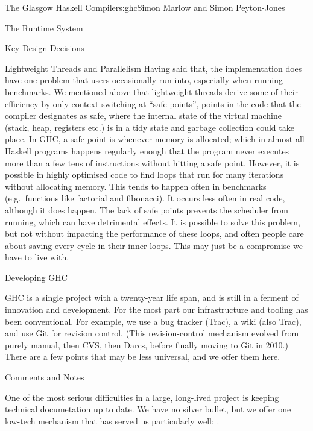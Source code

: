 \begin{aosachapter}{The Glasgow Haskell Compiler}{s:ghc}{Simon Marlow and Simon Peyton-Jones}
\begin{aosasect1}{The Runtime System}
\begin{aosasect2}{Key Design Decisions}
\begin{aosasect3}{Lightweight Threads and Parallelism}
Having said that, the implementation does have one problem that users
occasionally run into, especially when running benchmarks.  We
mentioned above that lightweight threads derive some of their
efficiency by only context-switching at ``safe points'', points in the
code that the compiler designates as safe, where the internal state of
the virtual machine (stack, heap, registers etc.) is in a tidy state
and garbage collection could take place.  In GHC, a safe point is
whenever memory is allocated; which in almost all Haskell programs
happens regularly enough that the program never executes more than a
few tens of instructions without hitting a safe point.  However, it is
possible in highly optimised code to find loops that run for many
iterations without allocating memory.  This tends to happen often in
benchmarks (e.g.\ functions like factorial and fibonacci).  It occurs
less often in real code, although it does happen.  The lack of safe
points prevents the scheduler from running, which can have detrimental
effects.  It is possible to solve this problem, but not without
impacting the performance of these loops, and often people care about
saving every cycle in their inner loops.  This may just be a
compromise we have to live with.

\end{aosasect3}

\end{aosasect2}

\end{aosasect1}

\begin{aosasect1}{Developing GHC}

GHC is a single project with a twenty-year life span, and is still in
a ferment of innovation and development.  For the most part our
infrastructure and tooling has been conventional.  For example, we use
a bug tracker (Trac), a wiki (also Trac), and use Git for revision
control. (This revision-control mechanism evolved from purely manual,
then CVS, then Darcs, before finally moving to Git in 2010.)  There
are a few points that may be less universal, and we offer them here.

\begin{aosasect2}{Comments and Notes}

One of the most serious difficulties in a large, long-lived project is
keeping technical documetation up to date.  We have no silver bullet,
but we offer one low-tech mechanism that has served us particularly
well: .


\end{aosasect2}
\end{aosasect1}
\end{aosachapter}
